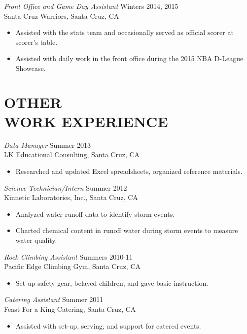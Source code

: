 \documentclass[margin]{res}
\begin{document}
\begin{resume}
\textit{Front Office and Game Day Assistant} \hfill Winters 2014, 2015
\\Santa Cruz Warriors, Santa Cruz, CA 
\begin{itemize}
\item[-] Assisted with the stats team and occasionally served as official scorer at scorer’s table.
\vspace{-3pt}\item[-] Assisted with daily work in the front office during the 2015 NBA D-League Showcase.
\end{itemize}


\section{OTHER \\WORK EXPERIENCE}
\vspace{0pt}
\textit{Data Manager} \hfill Summer 2013
\\LK Educational Consulting, Santa Cruz, CA 
\begin{itemize}
\item[-] Researched and updated Excel spreadsheets, organized reference materials.
\end{itemize}

\vspace{-6pt}
\textit{Science Technician/Intern } \hfill Summer 2012
\\Kinnetic Laboratories, Inc., Santa Cruz, CA 
\begin{itemize}
\item[-] Analyzed water runoff data to identify storm events.
\vspace{-3pt}\item[-] Charted chemical content in runoff water during storm events to measure water quality.
\end{itemize}

\vspace{-6pt}
\textit{Rock Climbing Assistant} \hfill Summers 2010-11
\\Pacific Edge Climbing Gym, Santa Cruz, CA 
\begin{itemize}
\item[-] Set up safety gear, belayed children, and gave basic instruction.
\end{itemize}

\vspace{-6pt}
\textit{Catering Assistant} \hfill Summer 2011
\\Feast For a King Catering, Santa Cruz, CA  	
\begin{itemize}
\item[-] Assisted with set-up, serving, and support for catered events.
\end{itemize}


\end{resume}
\end{document}
